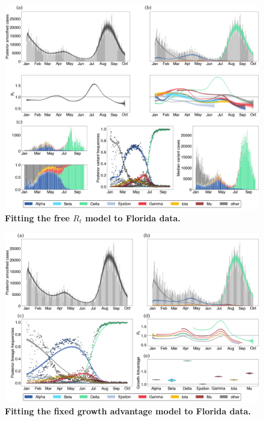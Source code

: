 \documentclass[11pt,oneside,letterpaper]{article}
\begin{document}
\begin{figure}
  \centering
  \includegraphics[width=\linewidth]{figs/free_rt_Florida.png}
  \caption{\textbf{Fitting the free $R_{t}$ model to Florida data.}}%
  \label{fig:free_rt_Florida}
\end{figure}

\begin{figure}
  \centering
  \includegraphics[width=\linewidth]{figs/fixed_growth_Florida.png}
  \caption{\textbf{Fitting the fixed growth advantage model to Florida data.}}%
  \label{fig:fixed_growth_Florida}
\end{figure}
\end{document}
